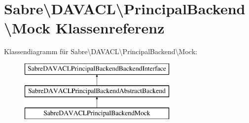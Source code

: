 \hypertarget{class_sabre_1_1_d_a_v_a_c_l_1_1_principal_backend_1_1_mock}{}\section{Sabre\textbackslash{}D\+A\+V\+A\+CL\textbackslash{}Principal\+Backend\textbackslash{}Mock Klassenreferenz}
\label{class_sabre_1_1_d_a_v_a_c_l_1_1_principal_backend_1_1_mock}
Klassendiagramm für Sabre\textbackslash{}D\+A\+V\+A\+CL\textbackslash{}Principal\+Backend\textbackslash{}Mock\+:\begin{figure}[H]
\begin{center}
\leavevmode
\includegraphics[height=3.000000cm]{class_sabre_1_1_d_a_v_a_c_l_1_1_principal_backend_1_1_mock}
\end{center}
\end{figure}
